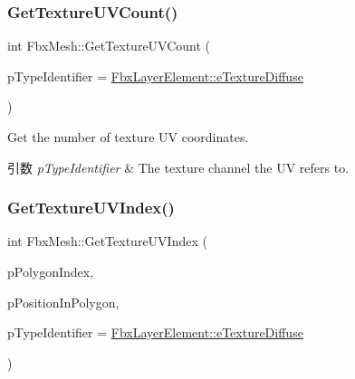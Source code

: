 \mbox{\label{class_fbx_mesh_a8a32eaf0ce16becd8e7de6c2783e61b9}} 
\subsubsection{\texorpdfstring{Get\+Texture\+U\+V\+Count()}{GetTextureUVCount()}}
{\footnotesize\ttfamily int Fbx\+Mesh\+::\+Get\+Texture\+U\+V\+Count (\begin{DoxyParamCaption}\item[{\hyperlink{class_fbx_layer_element_a8c95c5cd880b56c776acd379bd86f42c}{Fbx\+Layer\+Element\+::\+E\+Type}}]{p\+Type\+Identifier = {\ttfamily \hyperlink{class_fbx_layer_element_a8c95c5cd880b56c776acd379bd86f42ca09829e6ecf512e7ae04d9ad8de1342fa}{Fbx\+Layer\+Element\+::e\+Texture\+Diffuse}} }\end{DoxyParamCaption})}

Get the number of texture UV coordinates. 
\begin{DoxyParams}{引数}
{\em p\+Type\+Identifier} & The texture channel the UV refers to. \\
\hline
\end{DoxyParams}
\mbox{\label{class_fbx_mesh_aa62de6d7883e85e0efda70d37329d98a}} 
\subsubsection{\texorpdfstring{Get\+Texture\+U\+V\+Index()}{GetTextureUVIndex()}}
{\footnotesize\ttfamily int Fbx\+Mesh\+::\+Get\+Texture\+U\+V\+Index (\begin{DoxyParamCaption}\item[{int}]{p\+Polygon\+Index,  }\item[{int}]{p\+Position\+In\+Polygon,  }\item[{\hyperlink{class_fbx_layer_element_a8c95c5cd880b56c776acd379bd86f42c}{Fbx\+Layer\+Element\+::\+E\+Type}}]{p\+Type\+Identifier = {\ttfamily \hyperlink{class_fbx_layer_element_a8c95c5cd880b56c776acd379bd86f42ca09829e6ecf512e7ae04d9ad8de1342fa}{Fbx\+Layer\+Element\+::e\+Texture\+Diffuse}} }\end{DoxyParamCaption})}

